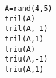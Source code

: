 \begin{examples}
\begin{Verbatim}
A=rand(4,5) 
tril(A) 
tril(A,-1) 
tril(A,1) 
triu(A) 
triu(A,-1) 
triu(A,1)
\end{Verbatim}
\end{examples}

\begin{manseealso}
\end{manseealso}

